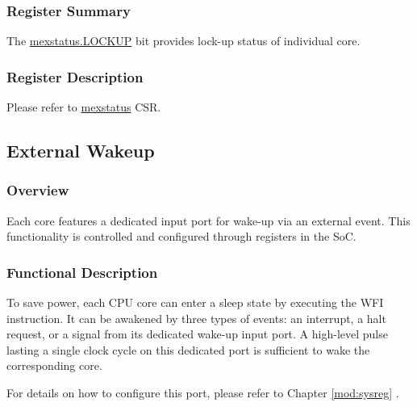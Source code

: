 \documentclass[main\_\_EN.tex]{subfiles}
\begin{document}
\subsubsection{Register Summary}
\label{sec:riscvcpu-custom-lockup-reg-summ}

The \hyperref[fielddesc:MEXSTATUS_LOCKUP]{mexstatus.LOCKUP} bit provides lock-up status of individual core.

\subsubsection{Register Description}
\label{sec:riscvcpu-custom-lockup-reg-desc}
Please refer to \hyperref[regdesc:MEXSTATUS]{mexstatus} CSR.


\subsection{External Wakeup}
\label{sec:riscvcpu-custom-ext-wakeup-features}
\subsubsection{Overview}
\label{sec:riscvcpu-custom-ext-wakeup-overview}

Each core features a dedicated input port for wake-up via an external event. This functionality is controlled and configured through registers in the SoC.

\subsubsection{Functional Description}
\label{sec:riscvcpu-custom-ext-wakeup-func-descr}

To save power, each CPU core can enter a sleep state by executing the WFI instruction. It can be awakened by three types of events: an interrupt, a halt request, or a signal from its dedicated wake-up input port. A high-level pulse lasting a single clock cycle on this dedicated port is sufficient to wake the corresponding core.

For details on how to configure this port, please refer to Chapter \ref{mod:sysreg} \textit{}.
\end{document}
